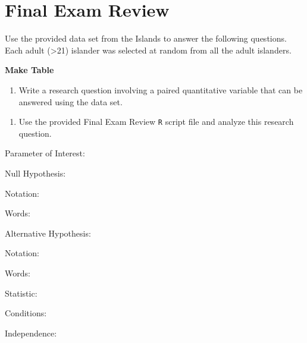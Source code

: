 \documentclass[
]{report}
\providecommand{\tightlist}{%
  \setlength{\itemsep}{0pt}\setlength{\parskip}{0pt}}
\newcommand{\rgi}{\hspace{24pt}}  %
\begin{document}
\hypertarget{final-exam-review}{%
\section{Final Exam Review}\label{final-exam-review}}


Use the provided data set from the Islands to answer the following questions. Each adult (\textgreater21) islander was selected at random from all the adult islanders.

\textbf{Make Table}

\begin{enumerate}
\def\labelenumi{\arabic{enumi}.}
\tightlist
\item
  Write a research question involving a paired quantitative variable that can be answered using the data set.
\end{enumerate}

\vspace{0.8in}

\begin{enumerate}
\def\labelenumi{\arabic{enumi}.}
\setcounter{enumi}{1}
\tightlist
\item
  Use the provided Final Exam Review \texttt{R} script file and analyze this research question.
\end{enumerate}

\rgi Parameter of Interest:

\vspace{0.3in}

\rgi Null Hypothesis:

\rgi \rgi Notation:

\vspace{0.3in}

\rgi \rgi Words:

\vspace{0.5in}

\rgi Alternative Hypothesis:

\rgi \rgi Notation:

\vspace{0.3in}

\rgi \rgi Words:

\vspace{0.5in}

\rgi Statistic:

\vspace{0.3in}

\rgi Conditions:

\rgi \rgi Independence:
\end{document}
